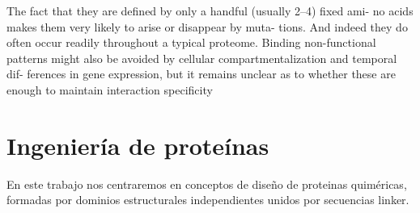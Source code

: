 The fact
that they are defined by only a handful (usually 2–4) fixed ami-
no acids makes them very likely to arise or disappear by muta-
tions. And indeed they do often occur readily throughout a
typical proteome.
Binding non-functional patterns might also
be avoided by cellular compartmentalization and temporal dif-
ferences in gene expression, but it remains unclear as to whether
these are enough to maintain interaction specificity











































\section{Ingeniería de proteínas}
\label{proteinEngineering}


En este trabajo nos centraremos en conceptos de diseño de proteinas quiméricas, formadas por dominios estructurales independientes unidos por secuencias linker.





